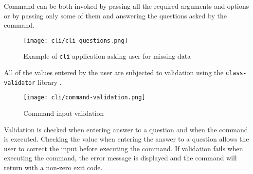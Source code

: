 \documentclass[../main.tex]{subfiles}
\begin{document}
Command can be both invoked by passing all the required arguments and options or by passing only some of them and answering the questions asked by the command.

\begin{figure}[H]
  \centering
  \texttt{[image: cli/cli-questions.png]}
  \caption{Example of \texttt{cli} application asking user for missing data}
\end{figure}

All of the values entered by the user are subjected to validation using the \texttt{class-validator} library \cite{class-validator}.

\begin{figure}[H]
  \centering
  \texttt{[image: cli/command-validation.png]}
  \caption{Command input validation}
\end{figure}

Validation is checked when entering answer to a question and when the command is executed.
Checking the value when entering the answer to a question allows the user to correct the input before executing the command.
If validation fails when executing the command, the error message is displayed and the command will return with a non-zero exit code.
\end{document}
